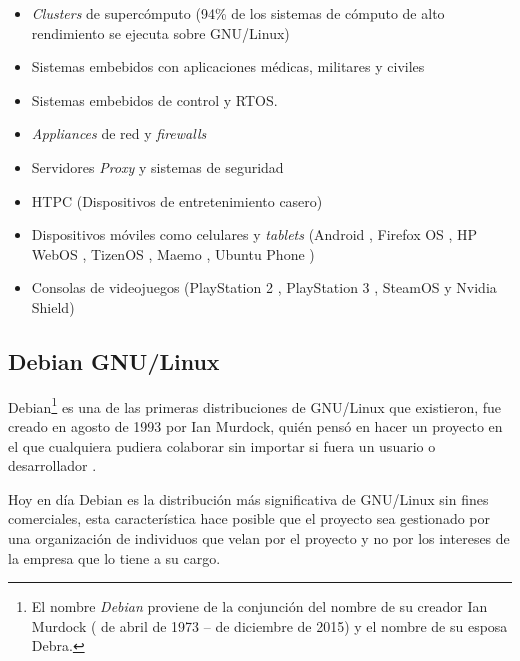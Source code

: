 \begin{itemize}
  \item \textit{Clusters} de superc\'{o}mputo (94\% de los sistemas de c\'{o}mputo de alto rendimiento se ejecuta sobre GNU/Linux) \cite{_tic_????}\cite{_94_????}
  \item Sistemas embebidos con aplicaciones m\'{e}dicas, militares y civiles \cite{_elinux.org_????}\cite{_rtos_????}
  \item Sistemas embebidos de control y \textsc{\gls{RTOS}}\cite{_uclinux_????}\cite{_rtos_????}.
  \item \textit{Appliances} de red y \textit{\glspl{firewall}} \cite{_router/bridge_????}\cite{_endian_????}
 \item Servidores \emph{\Gls{Proxy}} y sistemas de seguridad \cite{_f5_????}\cite{_junos_????}\cite{_infoblox_????}
  \item \textsc{HTPC} (Dispositivos de entretenimiento casero) \cite{_openelec_????}
  \item Dispositivos m\'{o}viles como celulares y \textit{tablets} (Android \cite{_android_????}, Firefox OS \cite{_firefox_????}, HP WebOS \cite{_hp_????}, TizenOS \cite{_tizen_????}, Maemo \cite{_maemo.org_????}, Ubuntu Phone \cite{_ubuntu_????})
  \item Consolas de videojuegos (PlayStation 2 \cite{_ps2_????}, PlayStation 3 \cite{_open_????}, SteamOS y Nvidia Shield)
\end{itemize}

  \subsection {Debian GNU/Linux}

Debian\footnote{El nombre \textit{Debian} proviene de la conjunci\'{o}n del nombre de su creador Ian Murdock ( de abril de 1973 –  de diciembre de 2015) y el nombre de su esposa Debra.} es una de las primeras distribuciones de GNU/Linux que existieron, fue creado en agosto de 1993 por Ian Murdock, qui\'{e}n pens\'{o} en hacer un proyecto en el que cualquiera pudiera colaborar sin importar si fuera un usuario o desarrollador \cite{_debian_????}.

Hoy en d\'{i}a Debian es la distribuci\'{o}n m\'{a}s significativa de GNU/Linux sin fines comerciales, esta caracter\'{i}stica hace posible que el proyecto sea gestionado por una organizaci\'{o}n de individuos que velan por el proyecto y no por los intereses de la empresa que lo tiene a su cargo.

